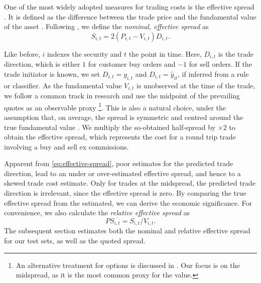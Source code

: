 One of the most widely adopted measures for trading costs is the effective spread \autocite[][112]{Piwowar_2006}. It is defined as the difference between the trade price and the fundamental value of the asset \autocite[][238--239]{bessembinderIssuesAssessingTrade2003}. Following \textcite[][238--239]{bessembinderIssuesAssessingTrade2003}, we define the \emph{nominal, effective spread} as
\begin{equation}
    S_{i,t} = 2 (P_{i,t} - V_{i,t}) D_{i,t}.
    \label{eq:effective-spread}
\end{equation}

Like before, $i$ indexes the security and $t$ the point in time. Here, $D_{i,t}$ is the trade direction, which is either $1$ for customer buy orders and $-1$ for sell orders. If the trade initiator is known, we set $D_{i,t} = y_{i,t}$ and $D_{i,t}=\hat{y}_{it}$, if inferred from a rule or classifier. As the fundamental value $V_{i,t}$ is unobserved at the time of the trade, we follow a common track in research and use the midpoint of the prevailing quotes as an observable proxy \footnote{An alternative treatment for options is discussed in \textcite[][4975--4976]{muravyevOptionsTradingCosts2020}. Our focus is on the midspread, as it is the most common proxy for the value.}. This is also a natural choice, under the assumption that, on average, the spread is symmetric and centred around the true fundamental value \autocite[][1018]{leeMarketIntegrationPrice1993}. We multiply the so-obtained half-spread by $\times 2$ to obtain the effective spread, which represents the cost for a round trip trade involving a buy and sell ex commissions.

Apparent from \cref{eq:effective-spread}, poor estimates for the predicted trade direction, lead to an under or over-estimated effective spread, and hence to a skewed trade cost estimate. Only for trades at the midspread, the predicted trade direction is irrelevant, since the effective spread is zero. By comparing the true effective spread from the estimated, we can derive the economic significance. For convenience, we also calculate the \emph{relative effective spread} as
\begin{equation}
    {PS}_{i,t} = S_{i,t} / V_{i,t}.
\end{equation}
The subsequent section estimates both the nominal and relative effective spread for our test sets, as well as the quoted spread.


